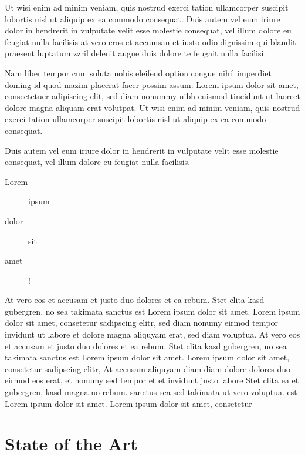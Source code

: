 Ut wisi enim ad minim veniam, quis nostrud exerci tation ullamcorper suscipit lobortis nisl ut aliquip ex ea commodo consequat. Duis autem vel eum iriure dolor in hendrerit in vulputate velit esse molestie consequat, vel illum dolore eu feugiat nulla facilisis at vero eros et accumsan et iusto odio dignissim qui blandit praesent luptatum zzril delenit augue duis dolore te feugait nulla facilisi.

Nam liber tempor cum soluta nobis eleifend option congue nihil imperdiet doming id quod mazim placerat facer possim assum. Lorem ipsum dolor sit amet, consectetuer adipiscing elit, sed diam nonummy nibh euismod tincidunt ut laoreet dolore magna aliquam erat volutpat. Ut wisi enim ad minim veniam, quis nostrud exerci tation ullamcorper suscipit lobortis nisl ut aliquip ex ea commodo consequat.

Duis autem vel eum iriure dolor in hendrerit in vulputate velit esse molestie consequat, vel illum dolore eu feugiat nulla facilisis.

\begin{description}
	\item[Lorem] ipsum
	\item[dolor] sit
	\item[amet] !
\end{description}

At vero eos et accusam et justo duo dolores et ea rebum. Stet clita kasd gubergren, no sea takimata sanctus est Lorem ipsum dolor sit amet. Lorem ipsum dolor sit amet, consetetur sadipscing elitr, sed diam nonumy eirmod tempor invidunt ut labore et dolore magna aliquyam erat, sed diam voluptua. At vero eos et accusam et justo duo dolores et ea rebum. Stet clita kasd gubergren, no sea takimata sanctus est Lorem ipsum dolor sit amet. Lorem ipsum dolor sit amet, consetetur sadipscing elitr, At accusam aliquyam diam diam dolore dolores duo eirmod eos erat, et nonumy sed tempor et et invidunt justo labore Stet clita ea et gubergren, kasd magna no rebum. sanctus sea sed takimata ut vero voluptua. est Lorem ipsum dolor sit amet. Lorem ipsum dolor sit amet, consetetur

\section{State of the Art}

